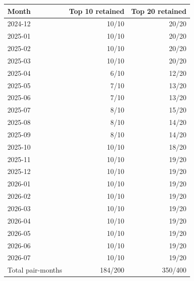 \begin{tabular}{@{}lrr@{}}
\toprule
Month & Top 10 retained & Top 20 retained \\
\midrule
2024-12 & 10/10 & 20/20 \\
2025-01 & 10/10 & 20/20 \\
2025-02 & 10/10 & 20/20 \\
2025-03 & 10/10 & 20/20 \\
2025-04 & 6/10 & 12/20 \\
2025-05 & 7/10 & 13/20 \\
2025-06 & 7/10 & 13/20 \\
2025-07 & 8/10 & 15/20 \\
2025-08 & 8/10 & 14/20 \\
2025-09 & 8/10 & 14/20 \\
2025-10 & 10/10 & 18/20 \\
2025-11 & 10/10 & 19/20 \\
2025-12 & 10/10 & 19/20 \\
2026-01 & 10/10 & 19/20 \\
2026-02 & 10/10 & 19/20 \\
2026-03 & 10/10 & 19/20 \\
2026-04 & 10/10 & 19/20 \\
2026-05 & 10/10 & 19/20 \\
2026-06 & 10/10 & 19/20 \\
2026-07 & 10/10 & 19/20 \\
\midrule
Total pair-months & 184/200 & 350/400 \\
\bottomrule
\end{tabular}
